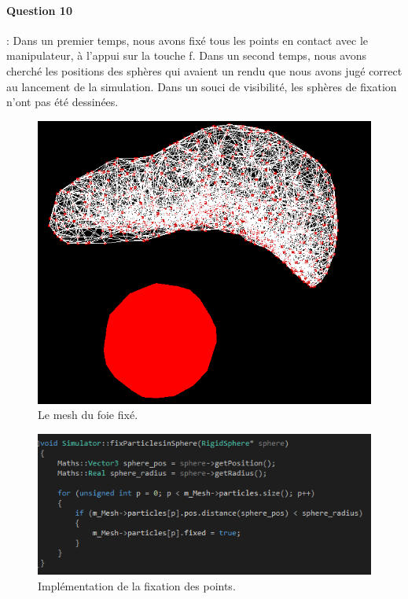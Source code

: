 \documentclass[a4paper,12pt]{article}
\begin{document}
\paragraph{Question 10} : Dans un premier temps, nous avons fixé tous les points en contact avec le manipulateur, à l'appui sur la touche \og{}f\fg{}. Dans un second temps, nous avons cherché les positions des sphères qui avaient un rendu que nous avons jugé correct au lancement de la simulation. Dans un souci de visibilité, les sphères \og{}de fixation\fg{} n'ont pas été dessinées.
\begin{figure}[ht!]
  \centering
  \includegraphics[width=\textwidth]{images/foie_fixe.png}
  \caption{Le mesh du foie fixé.}
  \label{fig:liver_fix}
\end{figure}

\begin{figure}[ht!]
  \centering
  \includegraphics[width=\textwidth]{images/fixation_code.png}
  \caption{Implémentation de la fixation des points.}
  \label{fig:fix_code}
\end{figure}
\end{document}
